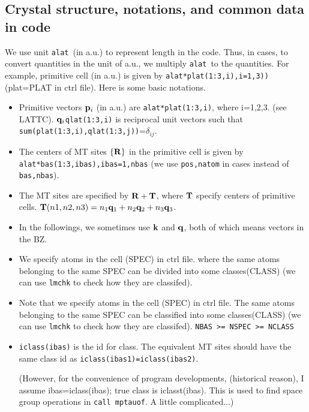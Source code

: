 \documentclass[a4paper,10pt,epsf,fleqn]{article}
\def\bfp{{\bf p}}
\newcommand{\bfq}{{\bf q}}
\newcommand{\bfk}{{\bf k}}
\newcommand{\bfT}{{\bf T}}
\newcommand{\bfR}{{\bf R}}
\newcommand{\io}[1]{{\sf  #1}}
\newcommand{\raw}[1]{{\tt #1}}
\newcommand{\alat}{{\raw{alat}}}
\begin{document}
\subsection{Crystal structure, notations, and common data in code}
\label{how to represent crystalstructure and symmetry}
We use unit \alat\ (in a.u.) to represent length in the code.
Thus, in cases, to convert quantities in the unit of a.u., we
multiply \alat\ to the quantities.
For example, primitive cell (in a.u.) is given by 
\verb!alat*plat(1:3,i),i=1,3))! (plat=PLAT in ctrl file).
Here is some basic notations.
\begin{itemize}
\item
Primitive vectors $\bfp_i$ (in a.u.) are
\raw{alat*plat(1:3,i)}, where i=1,2,3. (see \io{LATTC}).
$\bfq_i$\raw{qlat(1:3,i)} is reciprocal unit vectors such that
\raw{sum(plat(1:3,i),qlat(1:3,j))}=$\delta_{ij}$.

\item
The centers of MT sites $\{\bfR\}$ in the primitive cell
is given by \raw{alat*bas(1:3,ibas),ibas=1,nbas} 
(we use \verb#pos,natom# in cases instead of \verb#bas,nbas#). 
\item
The MT sites are specified by $\bfR+\bfT$, where $\bfT$ specify
centers of primitive 
cells. $\bfT(n1,n2,n3)=n_1 \bfq_1+n_2 \bfq_2 + n_3 \bfq_3$.

\item
In the followings, we sometimes use $\bfk$ and $\bfq$, both of
which means vectors in the BZ.

\item
  We specify atoms in the cell (SPEC) in ctrl file.
  where the same atoms belonging to the same SPEC can be
  divided into some classes(CLASS)
  (we can use \raw{lmchk} to check how they are classifed).

 \item
  Note that we specify atoms in the cell (SPEC) in ctrl file.
  The same atoms belonging to the same SPEC can be
  classified into some classes(CLASS)
  (we can use \raw{lmchk} to check how they are classifed).
  \raw{NBAS >= NSPEC >= NCLASS}
  
\item
\verb#iclass(ibas)# is the id for class. The equivalent
MT sites should have the same class id as \verb#iclass(ibas1)=iclass(ibas2)#. 

(However, for the convenience of program developments,
(historical reason), I assume ibas=iclass(ibas); true class
is iclasst(ibas). This is used to find space group operations
in \verb#call mptauof#. A little complicated...)
  
\end{itemize}
\end{document}
